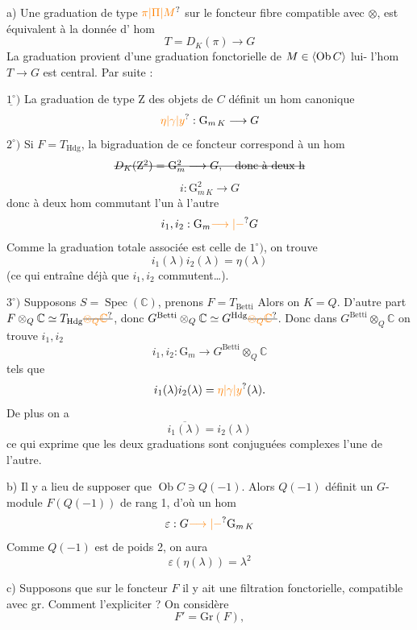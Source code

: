 a) Une graduation de type $\unsure{\pi|\Pi|M}$ sur le foncteur fibre  compatible avec $\otimes$, est équivalent à la donnée d' hom
\[
T=D_K(\pi)\longrightarrow G
\]
La graduation provient d'une graduation fonctorielle de $M\in\inserted{\operatorname{Ob}C}$ lui-  l'hom $T\longrightarrow G$ est central. Par suite :

$\underline{1^\circ})$ La graduation  de type $\mathrm Z$ des objets de $C$ définit un hom canonique
\[
\unsure{\eta|\gamma|y}:\mathrm{G}_{m\,K}\longrightarrow G
\]
$2^\circ)$ Si $F=T_{\mathrm{Hdg}}$, la bigraduation de ce foncteur correspond à un hom
\[
\deleted{D_K(\mathrm Z^2)=\mathrm G_m^2\longrightarrow G,\quad\text{donc à deux h}}
\]
\[
i:\mathrm G_{m\,K}^2\longrightarrow G
\]
donc à deux hom commutant l'un à l'autre
\[
i_1,i_2:\mathrm G_m\unsure{\longrightarrow|-}G
\]
Comme la graduation totale associée est celle de $1^\circ)$, on trouve
\[
i_1(\lambda)i_2(\lambda)=\eta(\lambda)
\]
(ce qui entraîne déjà que $i_1,i_2$ commutent\ldots).

$3^\circ)$ Supposons $S=\operatorname{Spec}(\mathbb C)$, prenons $F=T_{\mathrm{Betti}}$   Alors on  $K=Q$. D'autre part $F\otimes_Q\mathbb C\simeq T_{\mathrm{Hdg}}\deleted{\unsure{\otimes_Q\mathbb C}}$, donc  $G^{\mathrm{Betti}}\otimes_Q\mathbb C\simeq G^{\mathrm{Hdg}}\deleted{\unsure{\otimes_Q\mathbb C}}$. Donc dans $G^{\mathrm{Betti}}\otimes_Q\mathbb C$ on trouve  $i_1,i_2$
\[
i_1,i_2:\mathrm G_m\longrightarrow G^{\mathrm{Betti}}\otimes_Q\mathbb C
\]
tels que
\[
i_1(\lambda)i_2(\lambda)=\unsure{\eta|\gamma|y}(\lambda).
\]
De plus on a
\[
\overline{i_1(\lambda)}=i_2(\lambda)
\]
ce qui exprime que les deux graduations  sont conjuguées complexes l'une de l'autre.

b) Il y a lieu de supposer que $\operatorname{Ob}C\ni Q(-1)$. Alors $Q(-1)$  définit un $G$-module $F(Q(-1))$ de rang 1, d'où un hom
\[
\varepsilon:G\unsure{\longrightarrow|-}\mathrm G_{m\,K}
\]
Comme $Q(-1)$ est de  poids 2, on aura
\[
\boxed{\varepsilon(\eta(\lambda))=\lambda^2}
\]

c) Supposons que sur le foncteur $F$ il y ait une filtration fonctorielle, compatible avec gr. Comment l'expliciter ? On considère
\[
F'=\mathrm{Gr}(F),
\]

